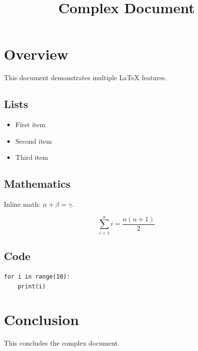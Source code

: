 \documentclass{article}
\title{Complex Document}
\begin{document}
\maketitle

\section{Overview}

This document demonstrates multiple LaTeX features.

\subsection{Lists}

\begin{itemize}
\item First item
\item Second item
\item Third item
\end{itemize}

\subsection{Mathematics}

Inline math: $\alpha + \beta = \gamma$.

\begin{equation}
\sum_{i=1}^{n} i = \frac{n(n+1)}{2}
\end{equation}

\subsection{Code}

\begin{verbatim}
for i in range(10):
    print(i)
\end{verbatim}

\section{Conclusion}

This concludes the complex document.
\end{document}
